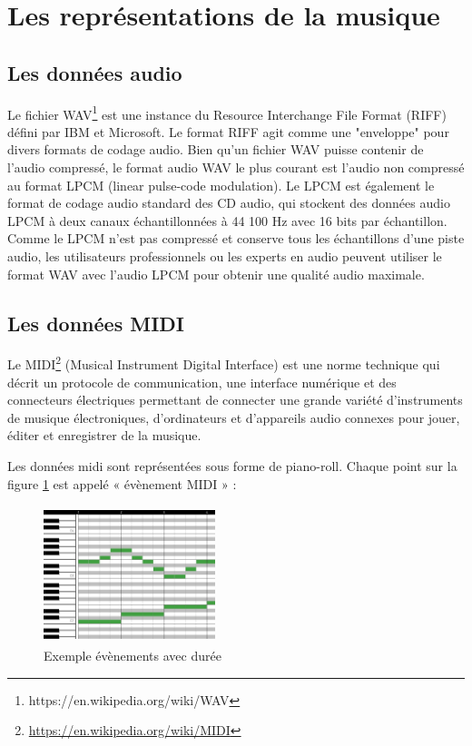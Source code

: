 \section{Les représentations de la musique}

\subsection*{Les données audio}
Le fichier WAV\footnote{https://en.wikipedia.org/wiki/WAV} est une instance du
Resource Interchange File Format (RIFF) défini par IBM et Microsoft. Le format
RIFF agit comme une "enveloppe" pour divers formats de codage audio.
Bien qu'un fichier WAV puisse contenir de l'audio compressé, le format audio
WAV le plus courant est l'audio non compressé au format LPCM (linear pulse-code
modulation). Le LPCM est également le format de codage audio standard des CD
audio, qui stockent des données audio LPCM à deux canaux échantillonnées à
44 100 Hz avec 16 bits par échantillon. Comme le LPCM n'est pas compressé et
conserve tous les échantillons d'une piste audio, les utilisateurs
professionnels ou les experts en audio peuvent utiliser le format WAV avec
l'audio LPCM pour obtenir une qualité audio maximale.

\subsection*{Les données MIDI}
Le MIDI\footnote{\url{https://en.wikipedia.org/wiki/MIDI}} (Musical Instrument Digital Interface) 
est une norme technique qui décrit un protocole de communication, une interface numérique et des connecteurs électriques permettant de connecter une grande variété d'instruments de musique électroniques, d'ordinateurs et d'appareils audio connexes pour jouer, éditer et enregistrer de la musique.

Les données midi sont représentées sous forme de piano-roll. 
%
Chaque point sur la figure \ref{piano_roll} est appelé « évènement MIDI » :
\begin{figure}[!h]
	\centering
	\includegraphics[height=40mm, width=50mm]{z_images/1_contexte/2_midi_piano.jpg}
	\caption{Exemple évènements avec durée}
	\label{piano_roll}
\end{figure}

